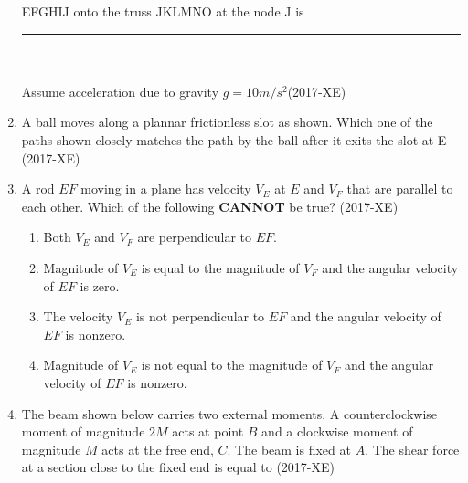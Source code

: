 \documentclass[journal]{IEEEtran}
\begin{document}
\begin{enumerate}
 EFGHIJ onto the truss JKLMNO at the node J is \rule{2.5cm}{0.6pt} \\\\ Assume acceleration due to gravity $g = 10m/s^2$\hfill(2017-XE)

\item A ball moves along a plannar frictionless slot as shown. Which one of the paths shown closely matches the path by the ball after it exits the slot at E \hfill(2017-XE)
\begin{enumerate}
\end{enumerate}

\item A rod $EF$ moving in a plane has velocity $V_E$ at $E$ and $V_F$ that are parallel to each other. Which of the following \textbf{CANNOT} be true? \hfill(2017-XE)

\begin{enumerate}
    \item Both $V_E$ and $V_F$ are perpendicular to $EF$.
    \item Magnitude of $V_E$ is equal to the magnitude of $V_F$ and the angular velocity of $EF$ is zero.
    \item The velocity $V_E$ is not perpendicular to $EF$ and the angular velocity of $EF$ is nonzero.
    \item Magnitude of $V_E$ is not equal to the magnitude of $V_F$ and the angular velocity of $EF$ is nonzero.
\end{enumerate}
\item The beam shown below carries two external moments. A counterclockwise moment of magnitude $2M$ acts at point $B$ and a clockwise moment of magnitude $M$ acts at the free end, $C$. The beam is fixed at $A$. The shear force at a section close to the fixed end is equal to \hfill(2017-XE)

\begin{enumerate}

\end{enumerate}
\end{enumerate}
\end{document}
